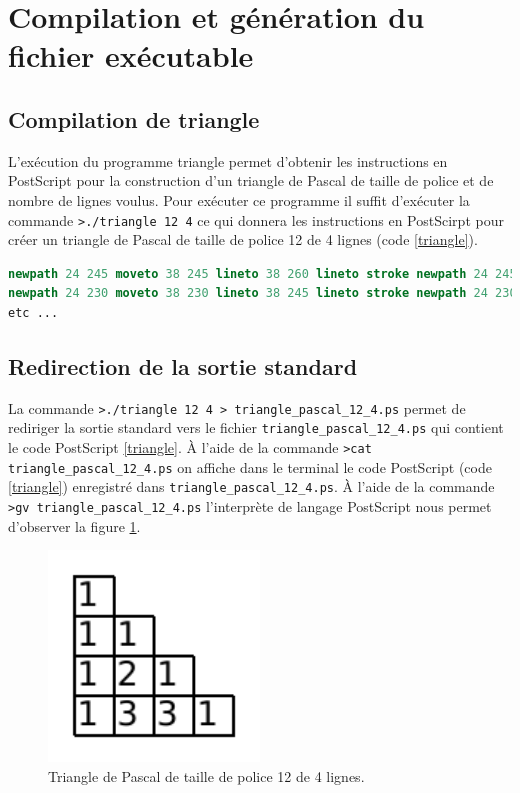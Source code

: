 \section{Compilation et génération du fichier exécutable}

\subsection{Compilation de triangle}
L'exécution du programme triangle permet d'obtenir les instructions en PostScript pour la construction d'un triangle de Pascal de taille de police et de nombre de lignes voulus.
Pour exécuter ce programme il suffit d'exécuter la commande \verb|>./triangle 12 4| ce qui donnera les instructions en PostScirpt pour créer un triangle de Pascal de taille de police 12 de 4 lignes (code \ref{triangle}).
\begin{lstlisting}[language=PostScript, label=triangle, caption=./triangle 12 4]
newpath 24 245 moveto 38 245 lineto 38 260 lineto stroke newpath 24 245 moveto 24 260 lineto 38 260 lineto stroke /Courier findfont 12 scalefont setfont newpath 25 248 moveto (1) show 
newpath 24 230 moveto 38 230 lineto 38 245 lineto stroke newpath 24 230 moveto 24 245 lineto 38 245 lineto stroke /Courier findfont 12 scalefont setfont newpath 25 233 moveto (1) show 
etc ...
\end{lstlisting}

\subsection{Redirection de la sortie standard}
\label{sec:sortie}

La commande \verb|>./triangle 12 4 > triangle_pascal_12_4.ps| permet de rediriger la sortie standard vers le fichier \verb|triangle_pascal_12_4.ps| qui contient le code PostScript \ref{triangle}.
À l'aide de la commande \verb|>cat triangle_pascal_12_4.ps| on affiche dans le terminal le code PostScript (code \ref{triangle}) enregistré dans \verb|triangle_pascal_12_4.ps|.
À l'aide de la commande \verb|>gv triangle_pascal_12_4.ps| l'interprète de langage PostScript nous permet d'observer la figure \ref{fig:triangle_12_4}.

\begin{figure}[!h]
\begin{centering}
	\includegraphics[width=0.5\textwidth]{./images/triangle}
	\caption{Triangle de Pascal de taille de police 12 de 4 lignes.}
	\label{fig:triangle_12_4}
	\end{centering}
\end{figure}

